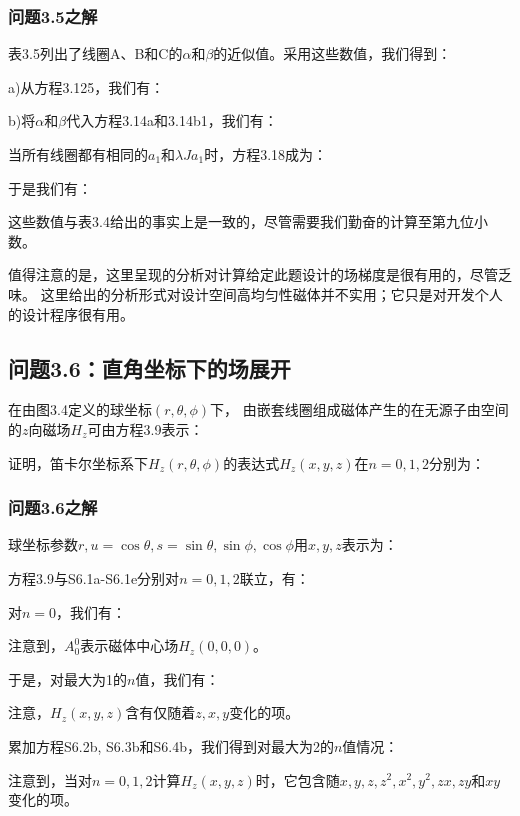 \subsubsection{问题3.5之解}
表3.5列出了线圈A、B和C的$\alpha$和$\beta$的近似值。采用这些数值，我们得到：



a)从方程3.125，我们有：

b)将$\alpha$和$\beta$代入方程3.14a和3.14b1，我们有：

当所有线圈都有相同的$a_1$和$\lambda J a_1$时，方程3.18成为：

于是我们有：

这些数值与表3.4给出的事实上是一致的，尽管需要我们勤奋的计算至第九位小数。

值得注意的是，这里呈现的分析对计算给定此题设计的场梯度是很有用的，尽管乏味。
这里给出的分析形式对设计空间高均匀性磁体并不实用；它只是对开发个人的设计程序很有用。
\newpage


\subsection{问题3.6：直角坐标下的场展开}
在由图3.4定义的球坐标$(r, \theta,\phi)$下，
由嵌套线圈组成磁体产生的在无源子由空间的$z$向磁场$H_z$可由方程3.9表示：

证明，笛卡尔坐标系下$H_z(r, \theta,\phi)$的表达式$H_z(x, y, z)$在$n=0, 1, 2$分别为：

\subsubsection{问题3.6之解}
球坐标参数$r, u = \cos\theta, s = \sin\theta, \sin\phi,\cos\phi$用$x,y,z$表示为：


方程3.9与S6.1a-S6.1e分别对$n=0,1,2$联立，有：

对$n=0$，我们有：

注意到，$A_0^0$表示磁体中心场$H_z(0, 0, 0)$。


于是，对最大为1的$n$值，我们有：

注意，$H_z(x, y, z)$含有仅随着$z,x,y$变化的项。


累加方程S6.2b, S6.3b和S6.4b，我们得到对最大为2的$n$值情况：

注意到，当对$n=0,1,2$计算$H_z(x, y, z)$时，它包含随$x, y, z, z^2, x^2, y^2, zx, zy$和$xy$变化的项。
\newpage

